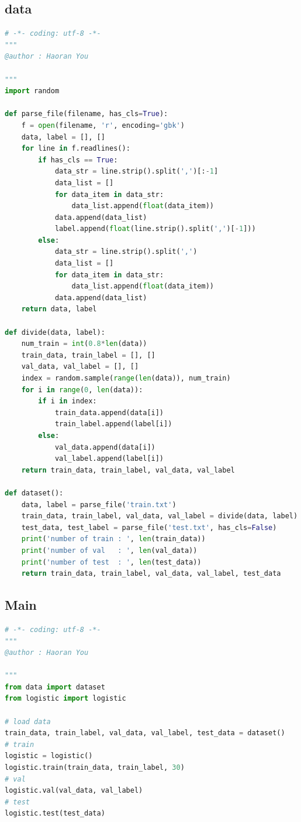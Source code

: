 \documentclass[UTF-8, a4paper, 10pt]{article}
\numberwithin{equation}{section}
\begin{document}
\subsection{data}
\begin{lstlisting}[language=python]
# -*- coding: utf-8 -*-
"""
@author : Haoran You

"""
import random

def parse_file(filename, has_cls=True):
    f = open(filename, 'r', encoding='gbk')
    data, label = [], []
    for line in f.readlines():
        if has_cls == True:
            data_str = line.strip().split(',')[:-1]
            data_list = []
            for data_item in data_str:
                data_list.append(float(data_item))
            data.append(data_list)
            label.append(float(line.strip().split(',')[-1]))
        else:
            data_str = line.strip().split(',')
            data_list = []
            for data_item in data_str:
                data_list.append(float(data_item))
            data.append(data_list)
    return data, label

def divide(data, label):
    num_train = int(0.8*len(data))
    train_data, train_label = [], []
    val_data, val_label = [], []
    index = random.sample(range(len(data)), num_train)
    for i in range(0, len(data)):
        if i in index:
            train_data.append(data[i])
            train_label.append(label[i])
        else:
            val_data.append(data[i])
            val_label.append(label[i])
    return train_data, train_label, val_data, val_label

def dataset():
    data, label = parse_file('train.txt')
    train_data, train_label, val_data, val_label = divide(data, label)
    test_data, test_label = parse_file('test.txt', has_cls=False)
    print('number of train : ', len(train_data))
    print('number of val   : ', len(val_data))
    print('number of test  : ', len(test_data))
    return train_data, train_label, val_data, val_label, test_data
\end{lstlisting}
\subsection{Main}
\begin{lstlisting}[language=python]
# -*- coding: utf-8 -*-
"""
@author : Haoran You

"""
from data import dataset
from logistic import logistic

# load data
train_data, train_label, val_data, val_label, test_data = dataset()
# train
logistic = logistic()
logistic.train(train_data, train_label, 30)
# val
logistic.val(val_data, val_label)
# test
logistic.test(test_data)
\end{lstlisting}
\end{document}
